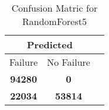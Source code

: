 \begin{table}[] 
\caption{Confusion Matric for RandomForest5} 
\label{Table: Prediction Accuracy-DMDRandomForest5OnlySunEKF-ignoreReflectionperfectNoFailurePrediction-Reflection} 
\centering 
\begin{tabular} 
 {@{}ccc@{}} 
\toprule 
\multicolumn{2}{c}{\textbf{Predicted}}
 \\ \midrule 
\multicolumn{1}{|c|}{Failure} & 
\multicolumn{1}{c|}{No Failure}
 \\ \midrule 
\multicolumn{1}{|c|}{\color{green}\textbf{94280}} & 
\multicolumn{1}{c|}{\color{red}\textbf{0}}
 \\ \midrule 
\multicolumn{1}{|c|}{\color{red}\textbf{22034}} & 
\multicolumn{1}{c|}{\color{green}\textbf{53814}}
 \\ \bottomrule 
\end{tabular} 
\end{table} 
